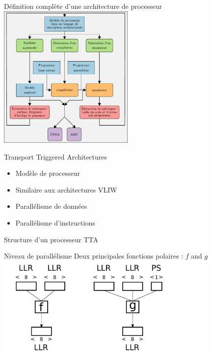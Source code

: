 \begin{frame}[c]{Définition complète d'une architecture de processeur}
  \centering
  \includegraphics[width=0.5\textwidth]{./fig/methodos-2}
\end{frame}

\begin{frame}[c]{Transport Triggered Architectures}
  \begin{itemize}
    \vfill
    \item Modèle de processeur
    \vfill
    \item Similaire aux architectures VLIW
    \vfill
    \item Parallélisme de données
    \vfill
    \item Parallélisme d'instructions
    \vfill
  \end{itemize}
\end{frame}

\begin{frame}[c]{Structure d'un processeur TTA}
\centering
\end{frame}

\begin{frame}[c]{Niveau de parallélisme}
  \centering
  \vfill
  Deux principales fonctions polaires : $f$ and $g$
  \vfill
  \includegraphics[width=0.7\textwidth]{fig/f_g_dimensions_scalar}
  \vfill
\end{frame}

